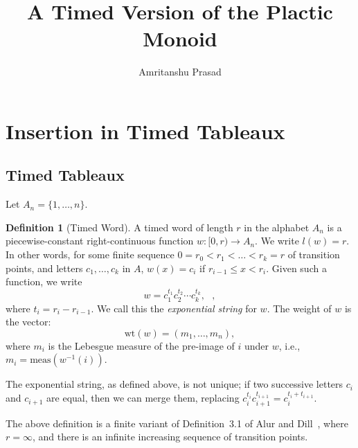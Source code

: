 \documentclass[10pt]{amsproc}
\title{A Timed Version of the Plactic Monoid}
\author{Amritanshu Prasad}
\theoremstyle{definition}
\newtheorem{definition}[theorem]{Definition}
\theoremstyle{remark}
\newcommand{\wt}{\mathrm{wt}}
\begin{document}
\renewcommand{\thesubsection}{\arabic{subsection}}
\maketitle
\section{Insertion in Timed Tableaux}
\label{sec:insertion}
\subsection{Timed Tableaux}
\label{sec:timed-tableaux}
Let $A_n=\{1,\dotsc,n\}$.
\begin{definition}
  [Timed Word]
  \label{definition:timed-word}
  A timed word of length $r$ in the alphabet $A_n$ is a piecewise-constant right-continuous function $w:[0,r)\to A_n$.
  We write $l(w)=r$.
  In other words, for some finite sequence $0=r_0<r_1<\dotsc<r_k=r$ of transition points, and letters $c_1,\dotsc, c_k$ in $A$, $w(x) = c_i$ if $r_{i-1}\leq x < r_i$.
  Given such a function, we write
  \begin{equation}
    \label{eq:exp_not}
    w = c_1^{t_1} c_2^{t_2}\dotsb c_k^{t_k}, \text{ },
  \end{equation}
  where $t_i = r_i-r_{i-1}$.
  We call this the \emph{exponential string} for $w$.
  The weight of $w$ is the vector:
  \begin{displaymath}
    \wt(w) = (m_1,\dotsc,m_n),
  \end{displaymath}
  where $m_i$ is the Lebesgue measure of the pre-image of $i$ under $w$, i.e., $m_i=\mathrm{meas}(w^{-1}(i))$.
\end{definition}
The exponential string, as defined above, is not unique; if two successive letters $c_i$ and $c_{i+1}$ are equal, then we can merge them, replacing $c_i^{t_i}c_{i+1}^{t_{i+1}} = c_i^{t_i+t_{i+1}}$.

The above definition is a finite variant of Definition~3.1 of Alur and Dill~\cite{alur-dill}, where $r=\infty$, and there is an infinite increasing sequence of transition points.
\end{document}
